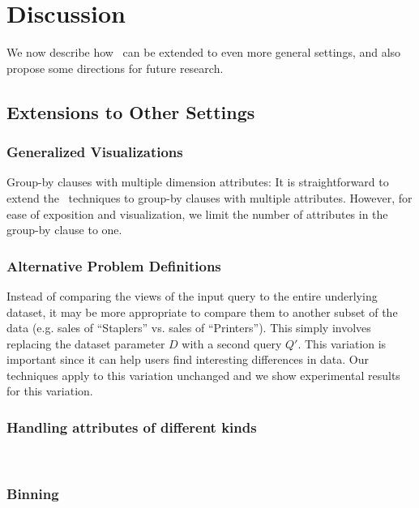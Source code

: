 

\section{Discussion}
\label{sec:discussion}
We now describe how \SeeDB\ can be extended to even more general settings,
and also propose some directions for future research.

\subsection{Extensions to Other Settings}\label{sec:discussion:ext}

\subsubsection{Generalized Visualizations}\label{sec:discussion:multi-col}

Group-by clauses with multiple dimension attributes: It is
straightforward to extend the \SeeDB\ techniques  to group-by clauses with multiple attributes.
However, for ease of exposition and visualization, we limit the number of
attributes in the group-by clause to one.

\subsubsection{Alternative Problem Definitions}\label{sec:discussion:def}
Instead of comparing the views of
the input query to the entire underlying dataset, it may be more appropriate to
compare them to another subset of the data (e.g. sales of ``Staplers'' vs.
sales of ``Printers''). This simply involves replacing the dataset parameter $D$
with a second query $Q'$. This variation is important since it can help users
find interesting differences in data. Our techniques apply to this variation
unchanged and we show experimental results for this variation.

\subsubsection{Handling attributes of different kinds}
\\

\subsubsection{Binning}

